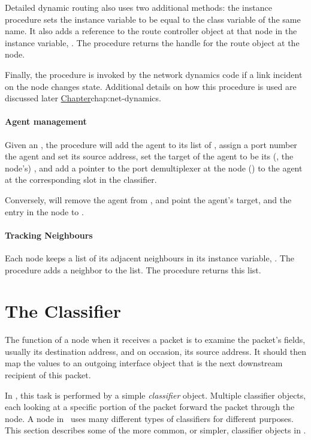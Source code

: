 {Detailed dynamic routing also uses two additional methods:
the instance procedure  sets the instance variable
 to be equal to the class variable of the same name.
It also adds a reference to the route controller object at that node
in the instance variable, .
The procedure  returns the handle for the route object 
at the node.

Finally, the procedure  is invoked by
the network dynamics code if a link incident on the node
changes state.  Additional details on how this procedure
is used are discussed later
\href{in the chapter on network dynamics}{Chapter}{chap:net-dynamics}.

\paragraph{Agent management}
Given an , the procedure  will
add the agent to its list of ,
assign a port number the agent and set its source address,
set the target of the agent to be its (\ie, the node's) ,
and add a pointer to the port demultiplexer at the node ()
to the agent at the corresponding slot in the  classifier.

Conversely, will remove the agent from ,
and point the agent's target, and the entry in the node 
to .

\paragraph{Tracking Neighbours}
Each node keeps a list of its adjacent neighbours in its instance variable,
.  The procedure  adds a neighbor to the list.  The procedure  returns this list.

\section{The Classifier}
\label{sec:node:classifiers}

The function of a node when it receives a packet is to examine
the packet's fields, usually its destination address, and
on occasion, its source address.
It should then map the values to an outgoing interface object
that is the next downstream recipient of this packet.

In \ns, this task is performed by a simple \emph{classifier} object.
Multiple classifier objects,
each looking at a specific portion of the packet
forward the packet through the node.
A node in \ns\ uses many different types of classifiers for different purposes.
This section describes some of the more common, or simpler,
classifier objects in \ns.

}
